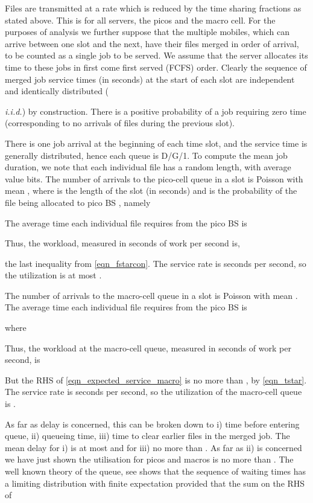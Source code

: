 \documentclass[12pt, draftcls, onecolumn]{IEEEtranTCOM}
\begin{document}
Files are transmitted at a rate which is reduced by the time sharing fractions as stated above. This is for all  servers, the  picos and the macro cell. For the purposes
of analysis we further suppose that the multiple mobiles, which can arrive between one slot and the next,
have their files merged in order of arrival, to be counted as a single job to be served. We assume that the server allocates its time to these jobs in first come first served (FCFS) order.
Clearly the sequence of merged job service
times  (in seconds) at the start of each slot are independent and identically distributed ({{\it i.i.d.}) by construction. There is a positive probability of a job requiring zero time (corresponding to no arrivals of files during the previous slot).

There is one job arrival at the beginning of each time slot, and the service time is generally distributed, hence each queue is D/G/1. To compute the mean job duration, we note that each individual file has a random length, with average value  bits. The number of arrivals to the pico-cell  queue in a slot is Poisson with mean , where  is the length of the slot (in seconds) and  is the probability of the file being allocated to pico BS , namely
{\small

}
The average time each individual file requires from the pico BS  is
{\small

}
Thus, the workload, measured in seconds of work per second is,
{\small

}
the last inequality from \eqref{eqn_fstarcon}. The service rate is  seconds per second, so the utilization is at most .


The number of arrivals to the macro-cell queue in a slot is Poisson with mean . The average time each individual file requires from the pico BS  is
{\small

}
where
{\small

}
Thus, the workload at the macro-cell queue, measured in seconds of work per second, is
{\small

}
But the RHS of \eqref{eqn_expected_service_macro} is no more than , by \eqref{eqn_tstar}. The service rate is  seconds per second, so the utilization of the macro-cell queue is . 

As far as delay is concerned, this can be broken down to i) time before entering queue, ii) queueing time, iii)
time to clear earlier files in the merged job. The mean delay for i) is at most  and for iii)
no more than . As far as ii) is concerned we have just shown the utilisation for picos and macros is no more than .
The well known theory of the  queue, see \cite{Spitzer} shows that the sequence of waiting times  has a limiting distribution with finite expectation provided that the sum on the RHS of
{\small

}}
\end{document}
